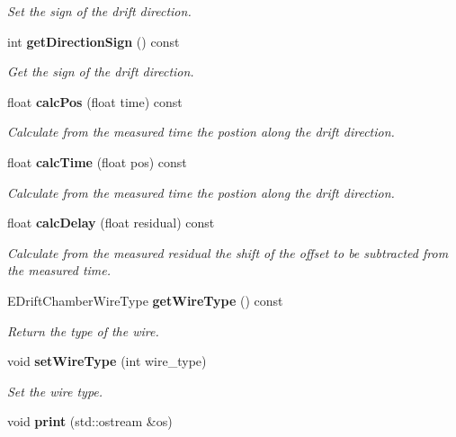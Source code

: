 \begin{DoxyCompactItemize}
\begin{DoxyCompactList}\small\item\em Set the sign of the drift direction. \end{DoxyCompactList}\item 
int {\bf get\-Direction\-Sign} () const \label{classCALICE_1_1DriftChamberParameter_a8ac5b85049c531796b2f2f06ad011639}

\begin{DoxyCompactList}\small\item\em Get the sign of the drift direction. \end{DoxyCompactList}\item 
float {\bf calc\-Pos} (float time) const 
\begin{DoxyCompactList}\small\item\em Calculate from the measured time the postion along the drift direction. \end{DoxyCompactList}\item 
float {\bf calc\-Time} (float pos) const 
\begin{DoxyCompactList}\small\item\em Calculate from the measured time the postion along the drift direction. \end{DoxyCompactList}\item 
float {\bf calc\-Delay} (float residual) const 
\begin{DoxyCompactList}\small\item\em Calculate from the measured residual the shift of the offset to be subtracted from the measured time. \end{DoxyCompactList}\item 
E\-Drift\-Chamber\-Wire\-Type {\bf get\-Wire\-Type} () const 
\begin{DoxyCompactList}\small\item\em Return the type of the wire. \end{DoxyCompactList}\item 
void {\bf set\-Wire\-Type} (int wire\-\_\-type)\label{classCALICE_1_1DriftChamberParameter_a9de6a8d30fab8e57684d3a7d0f00165a}

\begin{DoxyCompactList}\small\item\em Set the wire type. \end{DoxyCompactList}\item 
void {\bf print} (std\-::ostream \&os)\label{classCALICE_1_1DriftChamberParameter_ab1c4711a572d91c6baff942c93b42241}


\end{DoxyCompactItemize}
